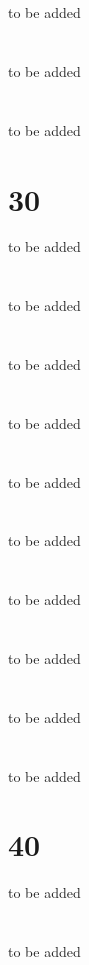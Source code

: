 \documentclass[12pt]{book}
\begin{document}
\section{}
to be added
\section{}
to be added
\section{}
to be added
\section{30}
to be added
\section{}
to be added
\section{}
to be added
\section{}
to be added
\section{}
to be added
\section{}
to be added
\section{}
to be added
\section{}
to be added
\section{}
to be added
\section{}
to be added
\section{40}
to be added
\section{}
to be added
\end{document}
